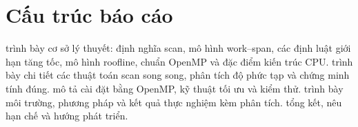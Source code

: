\section{Cấu trúc báo cáo}

 trình bày cơ sở lý thuyết: định nghĩa scan, mô hình work--span, các định
luật giới hạn tăng tốc, mô hình roofline, chuẩn OpenMP và đặc điểm kiến trúc CPU.
 trình bày chi tiết các thuật toán scan song song, phân tích độ phức tạp và
chứng minh tính đúng.  mô tả cài đặt bằng OpenMP, kỹ thuật tối ưu và kiểm thử.
 trình bày môi trường, phương pháp và kết quả thực nghiệm kèm phân tích.
 tổng kết, nêu hạn chế và hướng phát triển.
